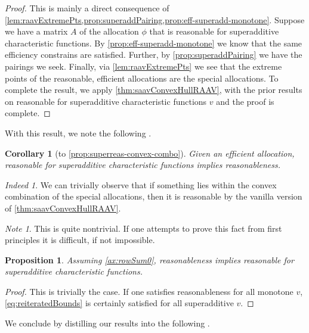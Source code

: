 \documentclass[12pt,letterpaper,final]{article}
\theoremstyle{plain}
\theoremstyle{plain}
\newtheorem{proposition}[theorem]{Proposition}
\theoremstyle{plain}
\theoremstyle{plain}
\theoremstyle{plain}
\newtheorem*{corollary}{Corollary}
\theoremstyle{plain}
\theoremstyle{plain}
\theoremstyle{definition}
\theoremstyle{definition}
\theoremstyle{definition}
\theoremstyle{definition}
\theoremstyle{definition}
\theoremstyle{remark}
\theoremstyle{remark}
\newtheorem*{note}{Note}
\theoremstyle{remark}
\theoremstyle{remark}
\newtheorem*{indeed}{Indeed}
\begin{document}
\begin{proof}
  This is mainly a direct consequence of
  \cref{lem:raavExtremePts,prop:superaddPairing,prop:eff-superadd-monotone}.
  Suppose we have a matrix \(A\) of the allocation \(\phi\) that is reasonable for
  superadditive characteristic functions. By
  \cref{prop:eff-superadd-monotone} we know that the same efficiency
  constrains are satisfied. Further, by \cref{prop:superaddPairing} we
  have the pairings we seek. Finally, via \cref{lem:raavExtremePts} we
  see that the extreme points of the reasonable, efficient
  allocations are the special allocations. To complete the result, we apply
  \cref{thm:saavConvexHullRAAV}, with the prior results on reasonable
  for superadditive characteristic functions \(v\) and the proof is complete.
\end{proof}

With this result, we note the following .

\begin{corollary}[to \cref{prop:superreas-convex-combo}]\label{cor:superreasreas}
  Given an efficient allocation, reasonable for superadditive
  characteristic functions implies reasonableness.
\end{corollary}

\begin{indeed}
  We can trivially observe that if something lies within the convex
  combination of the special allocations, then it is reasonable by the vanilla
  version of \cref{thm:saavConvexHullRAAV}.
\end{indeed}

\begin{note}
  This is quite nontrivial. If one attempts to prove this fact from first
  principles it is difficult, if not impossible.
\end{note}

\begin{proposition}
  Assuming \cref{ax:rowSum0}, reasonableness implies reasonable for
  superadditive characteristic functions.
\end{proposition}

\begin{proof}
  This is trivially the case. If one satisfies
  reasonableness for all monotone \(v\),
  \cref{eq:reiteratedBounds} is certainly satisfied for all
  superadditive \(v\).
\end{proof}

We conclude by distilling our results into the
following .
\end{document}
